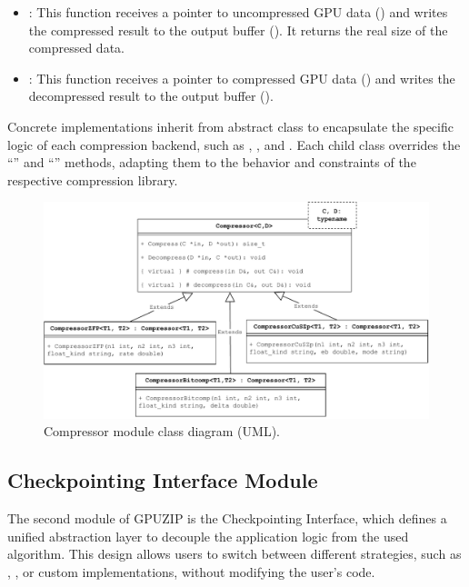 \documentclass[Ingles,Final]{ic-tese-v3}
\begin{document}
\begin{itemize}
    \item \textbf{}: This function receives a pointer to uncompressed GPU data () and writes the compressed result to the output buffer (). It returns the real size of the compressed data.
    \item \textbf{}: This function receives a pointer to compressed GPU data () and writes the decompressed result to the output buffer ().
\end{itemize}

Concrete implementations inherit from  abstract class to encapsulate the specific logic of each compression backend, such as , , and . Each child class overrides the ``'' and ``''  methods, adapting them to the behavior and constraints of the respective compression library.

\begin{figure}
  \centering
  \includegraphics[width=1\linewidth,trim={0 0 0 0},clip]{figures/oss/compressor_uml.pdf}
  \caption[Compressor module class diagram]{Compressor module class diagram (UML).}
  \label{fig:compressoruml}
\end{figure}


\subsection{Checkpointing Interface Module}

The second module of GPUZIP is the Checkpointing Interface, which defines a unified abstraction layer to decouple the application logic from the used \checkpointing algorithm. This design allows users to switch between different \checkpointing strategies, such as \revolve, \zcut, or custom implementations, without modifying the user's code.
\end{document}
